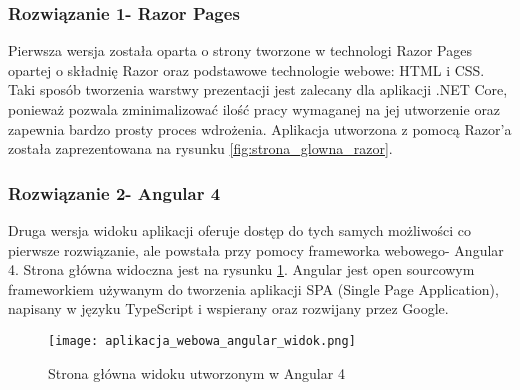 \subsubsection{Rozwiązanie 1- Razor Pages}
Pierwsza wersja została oparta o strony tworzone w technologi Razor Pages opartej o składnię Razor oraz podstawowe technologie webowe: HTML i CSS. Taki sposób tworzenia warstwy prezentacji jest zalecany dla aplikacji .NET Core, ponieważ pozwala zminimalizować ilość pracy wymaganej na jej utworzenie oraz zapewnia bardzo prosty proces wdrożenia. Aplikacja utworzona z pomocą Razor'a została zaprezentowana na rysunku \ref{fig:strona_glowna_razor}.

\subsubsection{Rozwiązanie 2- Angular 4}
Druga wersja widoku aplikacji oferuje dostęp do tych samych możliwości co pierwsze rozwiązanie, ale powstała przy pomocy frameworka webowego- Angular 4. Strona główna widoczna jest na rysunku \ref{fig:strona_glowna_angular}. Angular jest open sourcowym frameworkiem używanym do tworzenia aplikacji SPA (Single Page Application), napisany w języku TypeScript i wspierany oraz rozwijany przez Google.
\begin{figure}[H]
	\centering
	\texttt{[image: aplikacja\_webowa\_angular\_widok.png]}
	\caption{Strona główna widoku utworzonym w Angular 4}
	\label{fig:strona_glowna_angular}
\end{figure}

